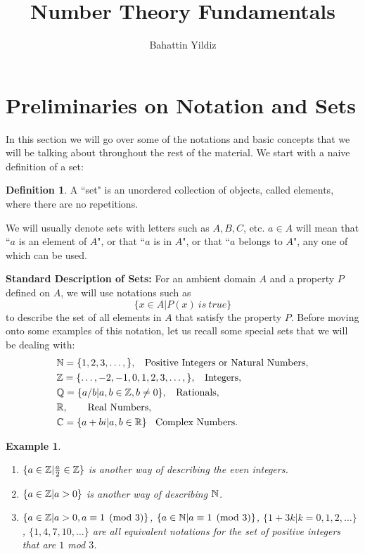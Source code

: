 \documentclass[12pt]{article}
\title{Number Theory Fundamentals}
\author{Bahattin Yildiz }
\date{}
\theoremstyle{plain}
\newtheorem{example}{Example}
\theoremstyle{definition}
\newtheorem{definition}{Definition}
\theoremstyle{remark}
\begin{document}
\maketitle
\section{Preliminaries on Notation and Sets}
In this section we will go over some of the notations and basic concepts that we will be talking about throughout the rest of the material.
We start with a naive definition of a set:
\begin{definition}
A ``set" is an unordered collection of objects, called elements, where there are no repetitions.
\end{definition}

We will usually denote sets with letters such as $A, B, C$, etc. $a\in A$ will mean that ``$a$ is an element of $A$", or that ``$a$ is in $A$", or that ``$a$ belongs to $A$", any one of which can be used.

{\bf Standard Description of Sets:} For an ambient domain $A$ and a property $P$ defined on $A$, we will use notations such as
$$\{x\in A| P(x)\: is\: true\}$$
to describe the set of all elements in $A$ that satisfy the property $P$.
Before moving onto some examples of this notation, let us recall some special sets that we will be dealing with:
\begin{align*}
&\mathbb{N} = \{1, 2, 3, \dots, \},\:\:\:\:\textrm{Positive Integers or Natural Numbers},\\
&\mathbb{Z} = \{\dots, -2, -1, 0, 1, 2, 3, \dots, \},\:\:\:\:\textrm{Integers},\\
& \mathbb{Q} = \{a/b| a,b \in \mathbb{Z}, b\neq 0\}, \:\:\:\:\textrm{Rationals},\\
&\mathbb{R}, \:\:\:\:\: \:\:\:\:\textrm{Real Numbers},\\
& \mathbb{C} = \{a+bi| a,b \in \mathbb{R}\} \:\:\:\:\textrm{Complex Numbers}.
\end{align*}

\begin{example}
\begin{enumerate}
    \item $\{a\in \mathbb{Z}| \frac{a}{2}\in \mathbb{Z}\}$ is another way of describing the even integers.
    \item $\{a\in \mathbb{Z}|a>0\}$ is another way of describing $\mathbb{N}$.
    \item $\{a\in \mathbb{Z}|a>0, a\equiv 1\pmod{3}\}$, $\{a\in \mathbb{N}|a\equiv 1\pmod{3}\}$, $\{1+3k|k=0,1,2, \dots \}$, $\{1,4,7,10, \dots \}$
    are all equivalent notations for the set of positive integers that are $1$ mod $3$.
\end{enumerate}
\end{example}
\end{document}

